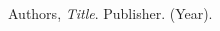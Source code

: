 \newpage

\begin{thebibliography}{99}

 Authors, {\it Title}. Publisher. (Year).

\end{thebibliography}
